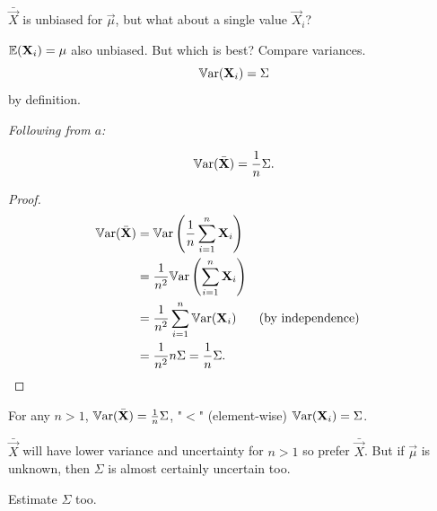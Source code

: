 \documentclass[10pt, a4paper]{article}
\begin{document}
\begin{example}
    $\bar{\vec{X}}$ is unbiased for $\vec{\mu}$,
    but what about a single value $\vec{X}_i$?

    $\mathbb{E}(\mathbf{X}_i) = \mathbf{\mu}$ also unbiased.
    But which is best?
    Compare variances.
    \[
    \mathbb{V}\mathrm{ar}(\mathbf{X}_i) = \Sigma
    \]
    by definition.
\end{example}

\textit{Following from $a$:}
\begin{proposition}[b]
    \[
    \mathbb{V}\mathrm{ar}(\bar{\mathbf{X}}) = \frac{1}{n}\Sigma.
    \]

    \begin{proof}
        \begin{align*}
            \mathbb{V}\mathrm{ar}(\bar{\mathbf{X}}) &= \mathbb{V}\mathrm{ar}\left(\frac{1}{n}\sum_{i = 1}^{n}\mathbf{X}_i\right) \\
            &= \frac{1}{n ^ 2}\mathbb{V}\mathrm{ar}\left(\sum_{i = 1}^{n}\mathbf{X}_i\right) \\
            &= \frac{1}{n ^ 2}\sum_{i = 1}^{n}\mathbb{V}\mathrm{ar}(\mathbf{X}_i) &&\text{(by independence)} \\
            &= \frac{1}{n ^ 2}n\Sigma = \frac{1}{n}\Sigma.
        \end{align*}
    \end{proof}
\end{proposition}

\begin{example}
    For any $n > 1$,
    $\mathbb{V}\mathrm{ar}(\bar{\mathbf{X}}) = \frac{1}{n}\Sigma$,
    "$<$"
    (element-wise)
    $\mathbb{V}\mathrm{ar}(\mathbf{X}_i) = \Sigma$.

    $\bar{\vec{X}}$ will have lower variance and uncertainty for $n > 1$ so prefer $\bar{\vec{X}}$.
    But if $\vec{\mu}$ is  unknown,
    then $\Sigma$ is almost certainly uncertain too.

    \begin{solution}
        Estimate $\Sigma$ too.
    \end{solution}
\end{example}
\end{document}
